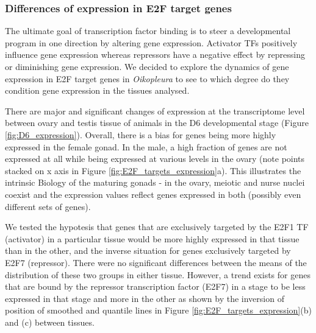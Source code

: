 \documentclass[11pt,twoside,a4paper]{report}
\begin{document}
		\subsubsection{Differences of expression in E2F target genes}
		The ultimate goal of transcription factor binding is to steer a developmental program in one direction by altering gene expression. Activator TFs positively influence gene expression whereas repressors have a negative effect by repressing or diminishing gene expression. We decided to explore the dynamics of gene expression in E2F target genes in \textit{Oikopleura} to see to which degree do they condition gene expression in the tissues analysed. 
		
    	There are major and significant changes of expression at the transcriptome level between ovary and testis tissue of animals in the D6 developmental stage (Figure \ref{fig:D6_expression}). Overall, there is a bias for genes being more highly expressed in the female gonad. In the male, a high fraction of genes are not expressed at all while being expressed at various levels in the ovary (note points stacked on x axis in Figure \ref{fig:E2F_targets_expression}a). This illustrates the intrinsic Biology of the maturing gonads - in the ovary, meiotic and nurse nuclei coexist and the expression values reflect genes expressed in both (possibly even different sets of genes).
		
		We tested the hypotesis that genes that are exclusively targeted by the E2F1 TF (activator) in a particular tissue would be more highly expressed in that tissue than in the other, and the inverse situation for genes exclusively targeted by E2F7 (repressor). There were no significant differences between the means of the distribution of these two groups in either tissue. However, a trend exists for genes that are bound by the repressor transcription factor (E2F7) in a stage to be less expressed in that stage and more in the other as shown by the inversion of position of smoothed and quantile lines in Figure \ref{fig:E2F_targets_expression}(b) and (c) between tissues.
		
\end{document}
